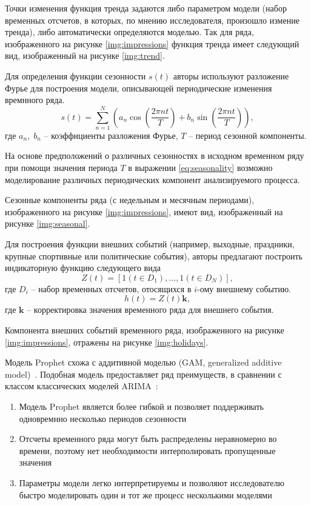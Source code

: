 Точки изменения функция тренда задаются либо параметром модели (набор временных отсчетов, в которых, по мнению
исследователя, произошло измение тренда), либо автоматически определяются моделью. Так для ряда, изображенного на 
рисунке \ref{img:impressions} функция тренда имеет следующий вид, изображенный на рисунке \ref{img:trend}.


Для определения функции сезонности $s(t)$ авторы используют разложение Фурье для построения модели, описывающей
периодические изменения времнного ряда.
\begin{equation}
    s(t) = \sum \limits_{n=1}^N \left( a_n \cos{\left( \dfrac{2\pi n t}{T} \right)} + b_n \sin{\left( \dfrac{2\pi n t}{T} \right)} \right),
    \label{eq:seasonality}
\end{equation}
где $a_n, \; b_n$ -- коэффициенты разложения Фурье, $T$ -- период сезонной компоненты.

На основе предположений о различных сезонностях в исходном временном ряду при помощи значения периода $T$ в выражении 
\eqref{eq:seasonality} возможно моделирование различных периодических компонент анализируемого процесса.

Сезонные компоненты ряда (с недельным и месячным периодами), изображенного на рисунке \eqref{img:impressions}, имеют вид, 
изображенный на рисунке \ref{img:seasonal}.


Для построения функции внешних событий (например, выходные, праздники, крупные спортивные или политические события),
авторы предлагают построить индикаторную функцию следующего вида
\begin{equation}
    Z(t) = \left[ 1 (t \in D_1), \dots, 1 (t \in D_N)\right],
\end{equation}
где $D_i$ -- набор временных отсчетов, отосящихся в $i$-ому внешнему событию.
\begin{equation}
    h(t) = Z(t)\mathbf{k},
\end{equation}
где $\mathbf{k}$ -- корректировка значения временного ряда для внешнего события.

Компонента внешних событий временного ряда, изображенного на рисунке \eqref{img:impressions}, отражены на рисунке 
\eqref{img:holidays}.


Модель Prophet схожа с аддитивной моделью (GAM, generalized additive model)~\autocite{ml:gam}. Подобная модель
предоставляет ряд преимуществ, в сравнении с классом классических моделей ARIMA~\autocite{ml:forecastintro}:
\begin{enumerate}
    \item Модель Prophet является более гибкой и позволяет поддерживать одновремнно несколько периодов сезонности
    \item Отсчеты временного ряда могут быть распределены неравномерно во времени, поэтому нет необходимости
    интерполировать пропущенные значения
    \item Параметры модели легко интерпретируемы и позволяют исследователю быстро моделировать один и тот же процесс
    несколькими моделями
\end{enumerate}